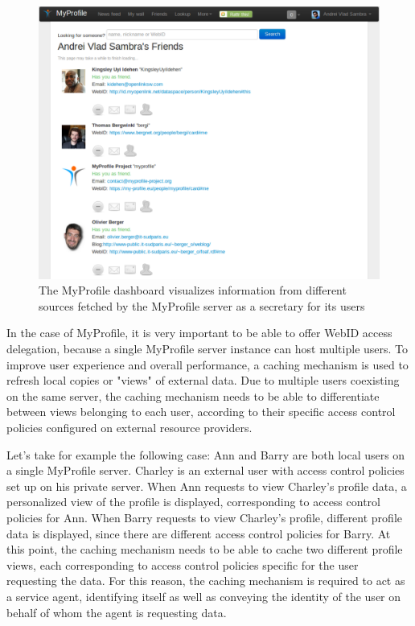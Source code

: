 \documentclass[a4paper]{llncs}
\begin{document}
\begin{figure}[htb]
  \centering
  \includegraphics[width=\textwidth]{myprofile}
  \caption{The MyProfile dashboard visualizes information from different sources fetched by the MyProfile server as a secretary for its users}
  \label{fig:myprofile}
\end{figure}

In the case of MyProfile, it is very important to be able to offer WebID access delegation, because a single MyProfile server instance can host multiple users.
To improve user experience and overall performance, a caching mechanism is used to refresh local copies or "views" of external data.
Due to multiple users coexisting on the same server, the caching mechanism needs to be able to differentiate between views belonging to each user, according to their specific access control policies configured on external resource providers.

Let's take for example the following case:
Ann and Barry are both local users on a single MyProfile server.
Charley is an external user with access control policies set up on his private server.
When Ann requests to view Charley's profile data, a personalized view of the profile is displayed, corresponding to access control policies for Ann.
When Barry requests to view Charley's profile, different profile data is displayed, since there are different access control policies for Barry.
At this point, the caching mechanism needs to be able to cache two different profile views, each corresponding to access control policies specific for the user requesting the data.
For this reason, the caching mechanism is required to act as a service agent, identifying itself as well as conveying the identity of the user on  behalf of whom the agent is requesting data.
\end{document}
